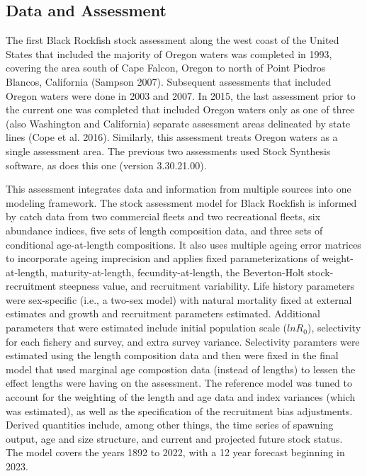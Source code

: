 \documentclass[11pt,
  letterpaper,
]{article}
\begin{document}
\clearpage

\hypertarget{data-and-assessment}{%
\subsection*{Data and Assessment}\label{data-and-assessment}}

The first Black Rockfish stock assessment along the west coast of the United States that included the majority of Oregon waters was completed in 1993, covering the area south of Cape Falcon, Oregon to north of Point Piedros Blancos, California (Sampson 2007). Subsequent assessments that included Oregon waters were done in 2003 and 2007. In 2015, the last assessment prior to the current one was completed that included Oregon waters only as one of three (also Washington and California) separate assessment areas delineated by state lines (Cope et al. 2016). Similarly, this assessment treats Oregon waters as a single assessment area. The previous two assessments used Stock Synthesis software, as does this one (version 3.30.21.00).

This assessment integrates data and information from multiple sources into one modeling framework. The stock assessment model for Black Rockfish is informed by catch data from two commercial fleets and two recreational fleets, six abundance indices, five sets of length composition data, and three sets of conditional age-at-length compositions. It also uses multiple ageing error matrices to incorporate ageing imprecision and applies fixed parameterizations of weight-at-length, maturity-at-length, fecundity-at-length, the Beverton-Holt stock-recruitment steepness value, and recruitment variability. Life history parameters were sex-specific (i.e., a two-sex model) with natural mortality fixed at external estimates and growth and recruitment parameters estimated. Additional parameters that were estimated include initial population scale (\(lnR_0\)), selectivity for each fishery and survey, and extra survey variance. Selectivity paramters were estimated using the length composition data and then were fixed in the final model that used marginal age compostion data (instead of lengths) to lessen the effect lengths were having on the assessment. The reference model was tuned to account for the weighting of the length and age data and index variances (which was estimated), as well as the specification of the recruitment bias adjustments. Derived quantities include, among other things, the time series of spawning output, age and size structure, and current and projected future stock status. The model covers the years 1892 to 2022, with a 12 year forecast beginning in 2023.
\end{document}
